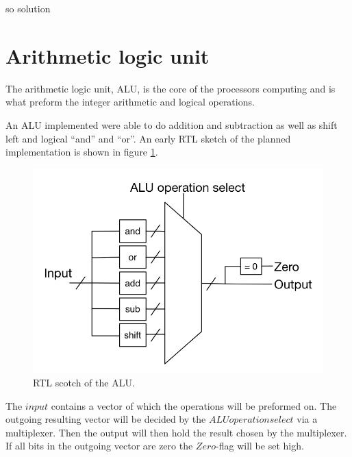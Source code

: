 so solution

\section{Arithmetic logic unit}
	\label{s:ALU}
	
	The arithmetic logic unit, ALU, is the core of the processors computing and is what preform the integer arithmetic and logical operations. 

An ALU implemented were able to do addition and subtraction as well as shift left and logical ``and'' and ``or''. An early RTL sketch of the planned implementation is shown in figure \ref{fig:alu}.
	
	\begin{figure} [H]
		\includegraphics[scale=1]{RTL/ALU.png}
		\caption{RTL scotch of the ALU.}
			\label{fig:alu}
	\end{figure}
	
	The $input$ contains a vector of which the operations will be preformed on. The outgoing resulting vector will be decided by the $ALU operation select$ via a multiplexer. Then the output will then hold the result chosen by the multiplexer. If all bits in the outgoing vector are zero the $Zero$-flag will be set high.